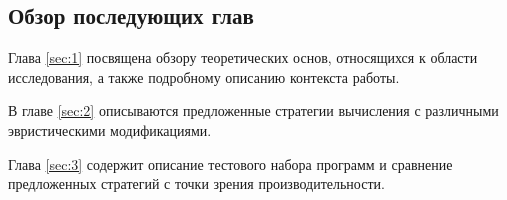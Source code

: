 \documentclass[../diploma.tex]{subfiles}
\begin{document}
\subsection*{Обзор последующих глав}

Глава \ref{sec:1} посвящена обзору теоретических основ, относящихся к области исследования, а также подробному описанию контекста работы.

В главе \ref{sec:2} описываются предложенные стратегии вычисления с различными эвристическими модификациями.

Глава \ref{sec:3} содержит описание тестового набора программ и сравнение предложенных стратегий с точки зрения производительности.
\end{document}
